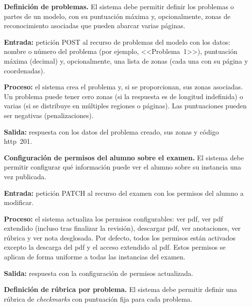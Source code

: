 \begin{functional}
    \item \textbf{Definición de problemas.} \label{rf:exams:problems}
    El sistema debe permitir definir los problemas o partes de un modelo, con su
    puntuación máxima y, opcionalmente, zonas de reconocimiento asociadas que pueden
    abarcar varias páginas.

    \textbf{Entrada:} petición POST al recurso de problemas del modelo con los datos: nombre
    o número del problema (por ejemplo, <<Problema~1>>), puntuación máxima (decimal) y,
    opcionalmente, una lista de zonas (cada una con su página y coordenadas).

    \textbf{Proceso:} el sistema crea el problema y, si se proporcionan, sus zonas
    asociadas. Un problema puede tener cero zonas (si la respuesta es de longitud
    indefinida) o varias (si se distribuye en múltiples regiones o páginas). Las
    puntuaciones pueden ser negativas (penalizaciones).

    \textbf{Salida:} respuesta con los datos del problema creado, sus zonas y código
    \acs{http}~201.

    \item \textbf{Configuración de permisos del alumno sobre el examen.}
    \label{rf:exams:student_perms}
    El sistema debe permitir configurar qué información puede ver el alumno sobre su
    instancia una vez publicada.

    \textbf{Entrada:} petición PATCH al recurso del examen con los permisos del alumno a
    modificar.

    \textbf{Proceso:} el sistema actualiza los permisos configurables: ver \acs{pdf},
    ver \acs{pdf} extendido (incluso tras finalizar la revisión), descargar \acs{pdf}, ver
    anotaciones, ver rúbrica y ver nota desglosada. Por defecto, todos los permisos están
    activados excepto la descarga del \acs{pdf} y el acceso extendido al \acs{pdf}. Estos
    permisos se aplican de forma uniforme a todas las instancias del examen.

    \textbf{Salida:} respuesta con la configuración de permisos actualizada.

    \item \textbf{Definición de rúbrica por problema.} \label{rf:exams:rubric}
    El sistema debe permitir definir una rúbrica de \textit{checkmarks} con puntuación fija
    para cada problema.


\end{functional}
